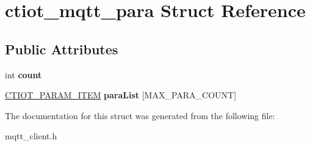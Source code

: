 \hypertarget{structctiot__mqtt__para}{}\section{ctiot\+\_\+mqtt\+\_\+para Struct Reference}
\label{structctiot__mqtt__para}
\subsection*{Public Attributes}
\begin{DoxyCompactItemize}
\item 
\mbox{\label{structctiot__mqtt__para_a85204351d168a4b805fec2e9365bd127}} 
int {\bfseries count}
\item 
\mbox{\label{structctiot__mqtt__para_ae0e408a39605269e205c6f2d3693b642}} 
\mbox{\hyperlink{struct_c_t_i_o_t___p_a_r_a_m___i_t_e_m}{C\+T\+I\+O\+T\+\_\+\+P\+A\+R\+A\+M\+\_\+\+I\+T\+EM}} {\bfseries para\+List} \mbox{[}M\+A\+X\+\_\+\+P\+A\+R\+A\+\_\+\+C\+O\+U\+NT\mbox{]}
\end{DoxyCompactItemize}


The documentation for this struct was generated from the following file\+:\begin{DoxyCompactItemize}
\item 
mqtt\+\_\+client.\+h\end{DoxyCompactItemize}
